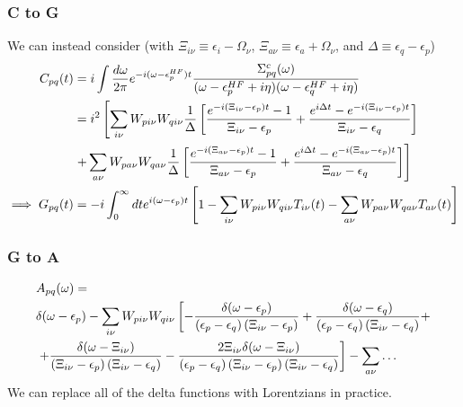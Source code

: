 \begin{frame}
    \frametitle{C to G}
\color{orange}
We can instead consider (with $\Xi_{i\nu} \equiv \epsilon_i - \Omega_\nu$, $\Xi_{a\nu} \equiv \epsilon_a + \Omega_\nu$, and $\Delta \equiv \epsilon_q - \epsilon_p$)
\begin{align}
    C_{pq}(t) &= i \int \frac{d\omega}{2\pi} e^{-i(\omega-\epsilon_p^{HF})t} \frac{\Sigma_{pq}^c(\omega)}{(\omega - \epsilon_p^{HF} + i\eta)(\omega - \epsilon_q^{HF} + i\eta)} \\
&=  i^2\left[ \sum_{i\nu} W_{p i \nu} W_{q i \nu} \frac{1}{\Delta}\left[\frac{e^{-i\left(\Xi_{i\nu} - \epsilon_p\right) t}-1 }{\Xi_{i\nu}-\epsilon_p} + \frac{e^{i\Delta t} - e^{-i\left(\Xi_{i\nu} - \epsilon_p\right) t}}{\Xi_{i\nu} - \epsilon_q}\right] \right.\\
& \left. + \sum_{a\nu} W_{p a \nu} W_{q a \nu} 
\frac{1}{\Delta}\left[{\frac{e^{-i\left(\Xi_{a\nu} - \epsilon_p\right) t}-1 }{\Xi_{a\nu}-\epsilon_p} + \frac{e^{i\Delta t} - e^{-i\left(\Xi_{a\nu} - \epsilon_p\right) t}}{\Xi_{a\nu} - \epsilon_q}}\right] \right] \notag \\
\implies G_{pq}(t) &= -i \int_0^\infty dt e^{i(\omega - \epsilon_p) t} \left[1- \sum_{i\nu} W_{p i \nu} W_{q i \nu} T_{i\nu}(t) - \sum_{a\nu} W_{p a \nu} W_{q a \nu} T_{a\nu}(t) \right] 
\end{align}

\end{frame}
\begin{frame}
    \frametitle{G to A}
\color{orange}
\begin{align}
    &A_{pq}(\omega) = \\ & \delta(\omega - \epsilon_p) - \sum_{i\nu} W_{p i \nu} W_{q i \nu} \left[-\frac{\delta(\omega - \epsilon_p)}{\left(\epsilon_p-\epsilon_q\right)\left(\Xi_{i\nu}-\epsilon_p\right)} + \frac{\delta(\omega - \epsilon_q)}{\left(\epsilon_p-\epsilon_q\right)\left(\Xi_{i\nu}-\epsilon_q\right)} + \right. \\
 & \left. + \frac{\delta(\omega - \Xi_{i\nu})}{\left(\Xi_{i\nu}-\epsilon_p\right)\left(\Xi_{i\nu}-\epsilon_q\right)} - \frac{2\Xi_{i\nu}\delta(\omega - \Xi_{i\nu})}{\left(\epsilon_p-\epsilon_q\right)\left(\Xi_{i\nu}-\epsilon_p\right)\left(\Xi_{i\nu}-\epsilon_q\right)}\right] - \sum_{a\nu} \ldots \notag
\end{align}
We can replace all of the delta functions with Lorentzians in practice.

\end{frame}
